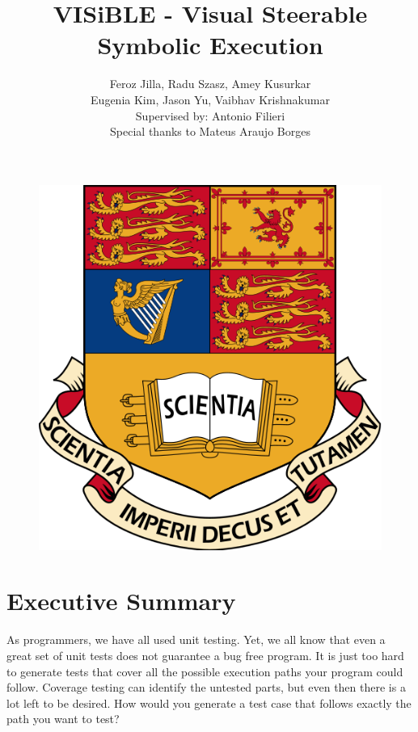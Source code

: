 \documentclass[titlepage,11pt]{article}
\begin{document}
\title{VISiBLE - Visual Steerable Symbolic Execution}
\author{Feroz Jilla, Radu Szasz, Amey Kusurkar \\ Eugenia Kim, Jason Yu, Vaibhav Krishnakumar \\ Supervised by: Antonio Filieri \\ Special thanks to Mateus Araujo Borges}
\date{}

\begin{figure}
\centering
\includegraphics[scale=0.5]{crest.png}
\end{figure}

\maketitle 
\newpage
\section*{Executive Summary}

As programmers, we have all used unit testing. Yet, we all know that even a great set of unit tests does not guarantee a bug free program.
It is just too hard to generate tests that cover all the possible execution paths your program could follow. Coverage testing can identify the
untested parts, but even then there is a lot left to be desired. How would you generate a test case that follows exactly the path you want to test? \\
\end{document}

